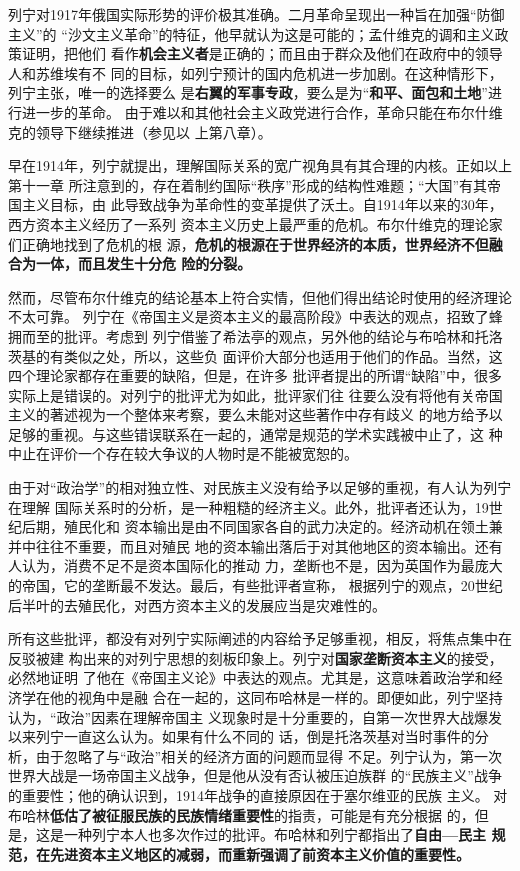 列宁对1917年俄国实际形势的评价极其准确。二月革命呈现出一种旨在加强“防御主义”的
“沙文主义革命”的特征，他早就认为这是可能的；孟什维克的调和主义政策证明，把他们
看作\textbf{机会主义者}是正确的；而且由于群众及他们在政府中的领导人和苏维埃有不
同的目标，如列宁预计的国内危机进一步加剧。在这种情形下，列宁主张，唯一的选择要么
是\textbf{右翼的军事专政}，要么是为“\textbf{和平、面包和土地}”进行进一步的革命。
由于难以和其他社会主义政党进行合作，革命只能在布尔什维克的领导下继续推进（参见以
上第八章）。

早在1914年，列宁就提出，理解国际关系的宽广视角具有其合理的内核。正如以上第十一章
所注意到的，存在着制约国际“秩序”形成的结构性难题；“大国”有其帝国主义目标，由
此导致战争为革命性的变革提供了沃土。自1914年以来的30年，西方资本主义经历了一系列
资本主义历史上最严重的危机。布尔什维克的理论家们正确地找到了危机的根
源，\textbf{危机的根源在于世界经济的本质，世界经济不但融合为一体，而且发生十分危
  险的分裂。}

然而，尽管布尔什维克的结论基本上符合实情，但他们得出结论时使用的经济理论不太可靠。
列宁在《帝国主义是资本主义的最高阶段》中表达的观点，招致了蜂拥而至的批评。考虑到
列宁借鉴了希法亭的观点，另外他的结论与布哈林和托洛茨基的有类似之处，所以，这些负
面评价大部分也适用于他们的作品。当然，这四个理论家都存在重要的缺陷，但是，在许多
批评者提出的所谓“缺陷”中，很多实际上是错误的。对列宁的批评尤为如此，批评家们往
往要么没有将他有关帝国主义的著述视为一个整体来考察，要么未能对这些著作中存有歧义
的地方给予以足够的重视。与这些错误联系在一起的，通常是规范的学术实践被中止了，这
种中止在评价一个存在较大争议的人物时是不能被宽恕的。

由于对“政治学”的相对独立性、对民族主义没有给予以足够的重视，有人认为列宁在理解
国际关系时的分析，是一种粗糙的经济主义。此外，批评者还认为，19世纪后期，殖民化和
资本输出是由不同国家各自的武力决定的。经济动机在领土兼并中往往不重要，而且对殖民
地的资本输出落后于对其他地区的资本输出。还有人认为，消费不足不是资本国际化的推动
力，垄断也不是，因为英国作为最庞大的帝国，它的垄断最不发达。最后，有些批评者宣称，
根据列宁的观点，20世纪后半叶的去殖民化，对西方资本主义的发展应当是灾难性的。

所有这些批评，都没有对列宁实际阐述的内容给予足够重视，相反，将焦点集中在反驳被建
构出来的对列宁思想的刻板印象上。列宁对\textbf{国家垄断资本主义}的接受，必然地证明
了他在《帝国主义论》中表达的观点。尤其是，这意味着政治学和经济学在他的视角中是融
合在一起的，这同布哈林是一样的。即便如此，列宁坚持认为，“政治”因素在理解帝国主
义现象时是十分重要的，自第一次世界大战爆发以来列宁一直这么认为。如果有什么不同的
话，倒是托洛茨基对当时事件的分析，由于忽略了与“政治”相关的经济方面的问题而显得
不足。列宁认为，第一次世界大战是一场帝国主义战争，但是他从没有否认被压迫族群
的“民族主义”战争的重要性；他的确认识到，1914年战争的直接原因在于塞尔维亚的民族
主义。 对布哈林\textbf{低估了被征服民族的民族情绪重要性}的指责，可能是有充分根据
的，但是，这是一种列宁本人也多次作过的批评。布哈林和列宁都指出了\textbf{自由—民主
  规范，在先进资本主义地区的减弱，而重新强调了前资本主义价值的重要性。}

